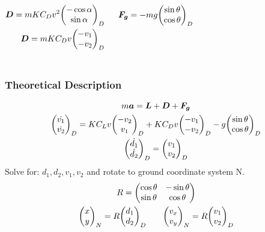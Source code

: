 \documentclass{beamer}
\begin{document}
\begin{frame}
\begin{columns}[onlytextwidth]
\begin{gather}
\begin{split}
\bm D = m K C_D v^2 \mqty(-\cos \alpha \\ \sin \alpha)_D\\
\bm D = m K C_D v \mqty(-v_1 \\ -v_2\\)_D
\end{split}
\end{gather}

\begin{gather}
\begin{split}
\bm F_{\bm g} = - m g  \mqty(\sin \theta \\ \cos \theta)_D
\end{split}
\end{gather}

\end{columns}

\end{frame}


\begin{frame}

\frametitle{Theoretical Description}

\begin{gather}
m \bm a = \bm L + \bm D + \bm F_{\bm g}\\
\mqty( \dot{v_1} \\ \dot{v_2}\\)_D = K  C_L v \mqty(-v_2 \\ v_1\\)_D + K C_D v \mqty(-v_1 \\ -v_2\\)_D - g  \mqty(\sin \theta \\ \cos \theta)_D\\
\mqty( \dot{d_1} \\ \dot{d_2}\\)_D = \mqty( v_1 \\v_2\\)_D
\end{gather}
Solve for: $d_1, d_2, v_1, v_2 $ and rotate to ground coordinate system N.
\begin{gather}
R = \mqty(\cos \theta & -\sin \theta \\ \sin \theta & \cos \theta)\\
\mqty(x \\ y)_N = R \mqty(d_1 \\ d_2)_D \qquad \mqty(v_x \\ v_y)_N = R \mqty(v_1 \\ v_2)_D
\end{gather}
\end{frame}
\end{document}
